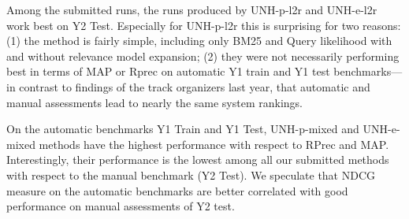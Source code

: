 \documentclass{article}
\begin{document}
Among the submitted runs, the runs produced by UNH-p-l2r and UNH-e-l2r work best on Y2 Test. Especially for UNH-p-l2r this is surprising for two reasons: (1) the method is fairly simple, including only BM25 and Query likelihood with and without relevance model expansion; (2) they were not necessarily performing best in terms of MAP or Rprec on automatic Y1 train and Y1 test benchmarks---in contrast to findings of the track organizers last year, that automatic and manual assessments lead to nearly the same system rankings.

On the automatic benchmarks Y1 Train and Y1 Test, UNH-p-mixed and UNH-e-mixed methods have the highest performance with respect to RPrec and MAP. Interestingly, their performance is the lowest among all our submitted methods with respect to the manual benchmark (Y2 Test). We speculate that NDCG measure on the automatic benchmarks are better correlated with good performance on manual assessments of Y2 test.

\begin{table}
\centering
\caption{Performance of entity retrieval methods. Y1 Train and Y2 Test benchmarks are derived from an automatically generated ground truth. The Y2 Test benchmark contains the TREC 2018 manual assessments.\label{tab:entity-results}}
\label{tab:entity}
\end{table}
\end{document}
